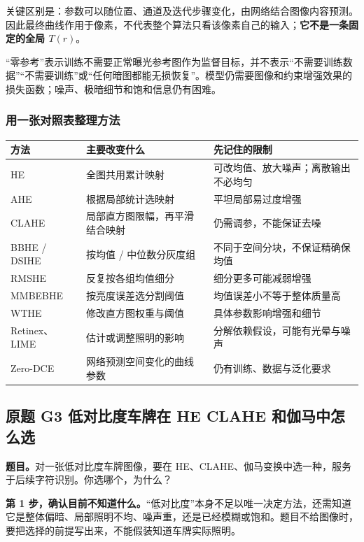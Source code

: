 关键区别是：参数可以随位置、通道及迭代步骤变化，由网络结合图像内容预测。因此最终曲线作用于像素，不代表整个算法只看该像素自己的输入；\textbf{它不是一条固定的全局 $T(r)$}。

“零参考”表示训练不需要正常曝光参考图作为监督目标，并不表示“不需要训练数据”“不需要训练”或“任何暗图都能无损恢复”。模型仍需要图像和约束增强效果的损失函数；噪声、极暗细节和饱和信息仍有困难。

\subsubsection*{用一张对照表整理方法}
\begin{center}
\small
\begin{tabularx}{\linewidth}{@{}p{2.4cm}p{4.4cm}X@{}}
\toprule
方法 & 主要改变什么 & 先记住的限制\\
\midrule
HE & 全图共用累计映射 & 可改均值、放大噪声；离散输出不必均匀\\
AHE & 根据局部统计选映射 & 平坦局部易过度增强\\
CLAHE & 局部直方图限幅，再平滑结合映射 & 仍需调参，不能保证去噪\\
BBHE / DSIHE & 按均值 / 中位数分灰度组 & 不同于空间分块，不保证精确保均值\\
RMSHE & 反复按各组均值细分 & 细分更多可能减弱增强\\
MMBEBHE & 按亮度误差选分割阈值 & 均值误差小不等于整体质量高\\
WTHE & 修改直方图权重与阈值 & 具体参数影响增强和细节\\
Retinex、LIME & 估计或调整照明的影响 & 分解依赖假设，可能有光晕与噪声\\
Zero-DCE & 网络预测空间变化的曲线参数 & 仍有训练、数据与泛化要求\\
\bottomrule
\end{tabularx}
\end{center}

\subsection{原题 G3 低对比度车牌在 HE CLAHE 和伽马中怎么选}
\label{original:G3}

\textbf{题目。}对一张低对比度车牌图像，要在 HE、CLAHE、伽马变换中选一种，服务于后续字符识别。你选哪个，为什么？

\textbf{第 1 步，确认目前不知道什么。}“低对比度”本身不足以唯一决定方法，还需知道它是整体偏暗、局部照明不均、噪声重，还是已经模糊或饱和。题目不给图像时，要把选择的前提写出来，不能假装知道车牌实际照明。

